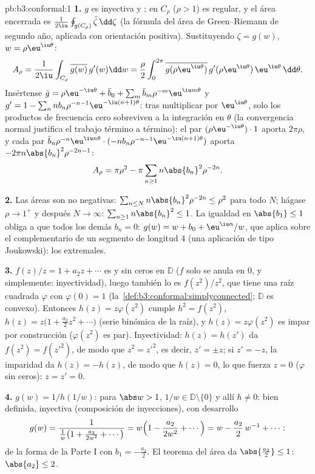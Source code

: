 \begin{solution}{pb:b3:conformal:1}
\textbf{1.} $g$ es inyectiva y
; en $C_\rho$ ($\rho > 1$) es
regular, y el área encerrada es
$\frac1{2\iu}\oint_{g(C_\rho)}\bar\zeta\,\dd\zeta$ (la fórmula del área
de Green--Riemann de segundo año, aplicada con orientación positiva).
Sustituyendo $\zeta = g(w)$, $w =
\rho\eu^{\iu\theta}$:
\[
A_\rho = \frac1{2\iu}\int_{C_\rho}\overline{g(w)}\,g'(w)\dd
w = \frac\rho2\int_0^{2\pi}\overline{g(\rho\eu^{\iu\theta})}
\,g'(\rho\eu^{\iu\theta})\,\eu^{\iu\theta}\,\dd\theta .
\]
Insértense $\bar g = \rho\eu^{-\iu\theta} + \bar b_0 +
\sum_m\bar b_m\rho^{-m}\eu^{\iu m\theta}$ y $g' = 1 -
\sum_nnb_n\rho^{-n-1}\eu^{-\iu(n+1)\theta}$: tras multiplicar por
$\eu^{\iu\theta}$, solo los productos de frecuencia cero sobreviven a la
integración en $\theta$ (la convergencia normal justifica el trabajo
término a término): el par $(\rho\eu^{-\iu\theta})\cdot1$ aporta
$2\pi\rho$, y cada par $\bar b_n\rho^{-n}\eu^{\iu
n\theta}\cdot(-nb_n\rho^{-n-1}\eu^{-\iu(n+1)\theta})$ aporta
$-2\pi n\abs{b_n}^2\rho^{-2n-1}$:
\[
A_\rho = \pi\rho^2 - \pi\sum_{n\geq1}n\abs{b_n}^2\rho^{-2n}.
\]

\textbf{2.} Las áreas son no negativas: $\sum_{n\leq
N}n\abs{b_n}^2\rho^{-2n} \leq \rho^2$ para todo $N$; hágase
$\rho \to 1^+$ y después $N \to \infty$:
$\sum_{n\geq1}n\abs{b_n}^2 \leq 1$. La igualdad en $\abs{b_1}
\leq 1$ obliga a que todos los demás $b_n = 0$: $g(w) = w + b_0 +
\eu^{\iu\alpha}/w$, que aplica sobre el complementario de un segmento de
longitud $4$ (una aplicación de tipo Joukowski): los extremales.

\textbf{3.} $f(z)/z = 1 + a_2z + \cdots$ es
 y sin ceros en $\mathbb D$
($f$ solo se anula en $0$, y simplemente: inyectividad), luego también
lo es $f(z^2)/z^2$, que tiene una raíz cuadrada
 $\varphi$ con
$\varphi(0) = 1$ (la~\cref{def:b3:conformal:simplyconnected};
$\mathbb D$ es convexo). Entonces $h(z) = z\varphi(z^2)$ cumple $h^2 =
f(z^2)$, $h(z) = z\bigl(1 + \frac{a_2}2z^2 + \cdots\bigr)$ (serie
binómica de la raíz), y $h(z) = z\varphi(z^2)$ es impar por construcción
($\varphi(z^2)$ es par). Inyectividad: $h(z) = h(z')$ da $f(z^2) =
f(z'^2)$, de modo que $z^2 = z'^2$, es decir, $z' = \pm z$; si
$z' = -z$, la imparidad da $h(z) = -h(z)$, de modo que $h(z) = 0$, lo
que fuerza $z
= 0$ ($\varphi$ sin ceros): $z = z' = 0$.

\textbf{4.} $g(w) = 1/h(1/w)$: para $\abs w > 1$, $1/w \in
\mathbb D\setminus\{0\}$ y allí $h \neq 0$: bien definida, inyectiva
(composición de inyecciones), con desarrollo
\[
g(w) = \frac{1}{\frac1w\bigl(1 + \frac{a_2}{2w^2} +
\cdots\bigr)} = w\Bigl(1 - \frac{a_2}{2w^2} + \cdots\Bigr)
= w - \frac{a_2}{2}\,w^{-1} + \cdots :
\]
de la forma de la Parte I con $b_1 = -\frac{a_2}2$. El teorema del área
da $\abs{\frac{a_2}2} \leq 1$: $\abs{a_2} \leq 2$.


\end{solution}
